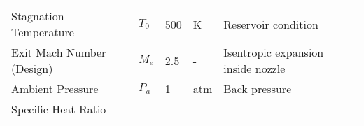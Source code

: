 \begin{longtable}[]{@{}lllll@{}}
\begin{minipage}[t]{0.23\columnwidth}
Stagnation Temperature\strut
\end{minipage} & \begin{minipage}[t]{0.07\columnwidth}\raggedright
\(T_0\)\strut
\end{minipage} & \begin{minipage}[t]{0.12\columnwidth}\raggedright
500\strut
\end{minipage} & \begin{minipage}[t]{0.06\columnwidth}\raggedright
K\strut
\end{minipage} & \begin{minipage}[t]{0.38\columnwidth}\raggedright
Reservoir condition\strut
\end{minipage}\tabularnewline
\begin{minipage}[t]{0.23\columnwidth}\raggedright
Exit Mach Number (Design)\strut
\end{minipage} & \begin{minipage}[t]{0.07\columnwidth}\raggedright
\(M_e\)\strut
\end{minipage} & \begin{minipage}[t]{0.12\columnwidth}\raggedright
2.5\strut
\end{minipage} & \begin{minipage}[t]{0.06\columnwidth}\raggedright
-\strut
\end{minipage} & \begin{minipage}[t]{0.38\columnwidth}\raggedright
Isentropic expansion inside nozzle\strut
\end{minipage}\tabularnewline
\begin{minipage}[t]{0.23\columnwidth}\raggedright
Ambient Pressure\strut
\end{minipage} & \begin{minipage}[t]{0.07\columnwidth}\raggedright
\(P_a\)\strut
\end{minipage} & \begin{minipage}[t]{0.12\columnwidth}\raggedright
1\strut
\end{minipage} & \begin{minipage}[t]{0.06\columnwidth}\raggedright
atm\strut
\end{minipage} & \begin{minipage}[t]{0.38\columnwidth}\raggedright
Back pressure\strut
\end{minipage}\tabularnewline
\begin{minipage}[t]{0.23\columnwidth}\raggedright
Specific Heat Ratio\strut
\end{minipage} & \begin{minipage}[t]{0.07\columnwidth}\raggedright

\end{minipage}
\end{longtable}

